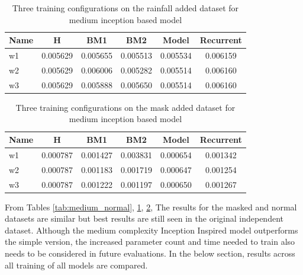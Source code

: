 \begin{table}[htbp]
	\centering
	\caption{Three training configurations on the rainfall added dataset for medium inception based model}
	\label{tab:medium_rf}
	\begin{tabular}{p{2cm}ccccc}
		\toprule
		Name &  H &  BM1 &  BM2 &  Model &  Recurrent \\
		\midrule
		w1 &       0.005629 &        0.005655 &        0.005513 &   0.005534 &            0.006159 \\
		w2 &       0.005629 &        0.006006 &        0.005282 &   0.005514 &            0.006160 \\
		w3 &       0.005629 &        0.005888 &        0.005650 &   0.005514 &            0.006160 \\
		\bottomrule
	\end{tabular}
\end{table}

\begin{table}[htbp]
	\centering
	\caption{Three training configurations on the mask added dataset for medium inception based model}
	\label{tab:medium_mask}
	\begin{tabular}{p{2cm}ccccc}
		\toprule
		Name &  H &  BM1 &  BM2 &  Model &  Recurrent \\
		\midrule
		w1 &       0.000787 &        0.001427 &        0.003831 &   0.000654 &            0.001342 \\
		w2 &       0.000787 &        0.001183 &        0.001719 &   0.000647 &            0.001254 \\
		w3 &       0.000787 &        0.001222 &        0.001197 &   0.000650 &            0.001267 \\
		\bottomrule
	\end{tabular}
\end{table}

From Tables \ref{tab:medium_normal}, \ref{tab:medium_rf}, \ref{tab:medium_mask}, The results for the masked and normal datasets are similar but best results are still seen in the original independent dataset. Although the medium complexity Inception Inspired model outperforms the simple version, the increased parameter count and time needed to train also needs to be considered in future evaluations. In the below section, results across all training of all models are compared. \\

